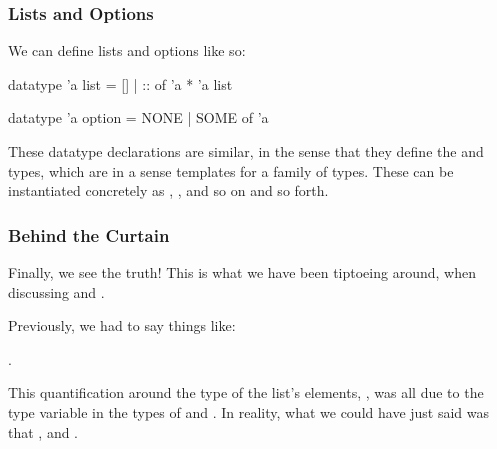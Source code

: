 \documentclass[aspectratio=169, handout]{beamer}
\begin{document}
\begin{frame}[fragile]
  \frametitle{Lists and Options}

  We can define lists and options like so:

  \begin{codeblock}
    datatype 'a list = [] | :: of 'a * 'a list

    datatype 'a option = NONE | SOME of 'a
  \end{codeblock}

  \pause
  \vspace{\fill}

  These datatype declarations are similar, in the sense that they define the
   and  types, which are in a sense templates for
  a family of types. These can be instantiated concretely as ,
  , and so on and so forth.

  \pause
  \vspace{\fill}

\end{frame}

\begin{frame}[fragile]
  \frametitle{Behind the Curtain}

  Finally, we see the truth! This is what we have been tiptoeing around, when
  discussing \code{[]} and \code{::}.

  \pause
  \vspace{\fill}

  Previously, we had to say things like:

  .

  \pause
  \vspace{\fill}

  This quantification around the type of the list's elements, , was all
  due to the type variable in the types of \code{[]} and \code{::}. In reality,
  what we could have just said was that , and 
  .

\end{frame}
\end{document}
